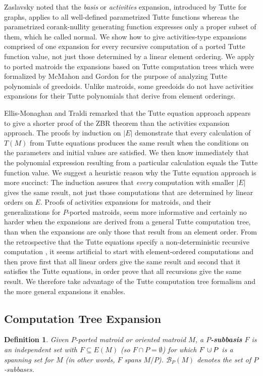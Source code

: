 \documentclass[12pt,leqno]{amsart}
\newtheorem{definition}[lem]{Definition}
\theoremstyle{remark}
\newcommand{\dunion}
{\mbox{\hbox{\hskip6pt$\cdot$\hskip-5.50pt$\cup$\hskip2pt}}}
\begin{document}
Zaslavsky\cite{MR93a:05047} noted that the 
\emph{basis} or \emph{activities}
expansion, introduced by Tutte
\cite{TutteDich,TutteGraphBook} for graphs, applies
to all well-defined parametrized 
Tutte functions whereas the 
parametrized corank-nullity generating function
expresses only a proper subset of them, which he called
normal.  We show
how to give activities-type expansions comprised of
one expansion for every recursive computation of
a ported Tutte function value, not just those
determined by a linear element ordering.
We apply to 
ported matroids the expansions based on
Tutte computation trees which were formalized
by 
McMahon and Gordon \cite{GordonMcMachonGreedoid}
for the purpose of analyzing Tutte polynomials
of greedoids.
Unlike matroids, some greedoids
do not have activities expansions for their Tutte polynomials
that derive from element orderings.

Ellis-Monaghan and 
Traldi \cite{Ellis-Monaghan-Traldi} remarked that the Tutte equation
approach appears to give a shorter proof of the ZBR theorem
than the activities expansion approach. 
The proofs by induction on $|E|$
demonstrate that every calculation of $T(M)$ from Tutte equations
produces the same result when the conditions on the parameters
and initial values are satisfied.  We then know immediately that
the polynomial expression
resulting from
a particular calculation equals the Tutte function value.
We suggest a heuristic reason why
the Tutte equation approach is more succinct:
The induction assures that
\emph{every} computation
with smaller $|E|$ gives the same result, not just those 
computations that are determined by linear orders on $E$.
%
Proofs of activities expansions for matroids, and their generalizations
for $P$-ported matroids, seem more informative and certainly
no harder when the expansions are derived from a general Tutte
computation tree, than when the expansions are only those
that result from an element order.   
From the retrospective that the Tutte equations
specify a non-deterministic recursive computation
\cite{Garey-Johnson}, it seems artificial to start with
element-ordered computations and then prove
first that all linear orders give the same result and 
second that it 
satisfies the Tutte equations, in order prove that 
all recursions give the same result.
We therefore
take advantage of the Tutte computation tree formalism
and the more general expansions it enables.

\subsection{Computation Tree Expansion}
\begin{definition}
Given $P$-ported matroid or oriented matroid $M$,
a \textbf{$P$-subbasis} $F$
is an independent set  with $F\subseteq E(M)$
(so $F\cap P=\emptyset$) for which $F\dunion P$ is a spanning set
for $M$
(in other words, $F$ spans $M/P$).
$\mathcal{B}_P(M)$ denotes the set of $P$-subbases.
\end{definition}
\end{document}
